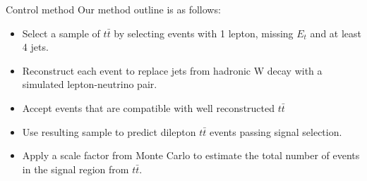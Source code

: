 \documentclass{beamer}
\begin{document}

\begin{frame}{Control method}
Our method outline is as follows:
  \begin{itemize}
    \item Select a sample of $t \bar{t}$ by selecting events with 1 lepton, missing $E_{t}$ and at least 4 jets.
    \item Reconstruct each event to replace jets from hadronic W decay with a simulated lepton-neutrino pair.
    \item Accept events that are compatible with well reconstructed $t \bar{t}$
    \item Use resulting sample to predict dilepton $t \bar{t}$ events passing signal selection.
    \item Apply a scale factor from Monte Carlo to estimate the total number of events in the signal region from $t \bar{t}$.
  \end{itemize}
\end{frame}


\end{document}
